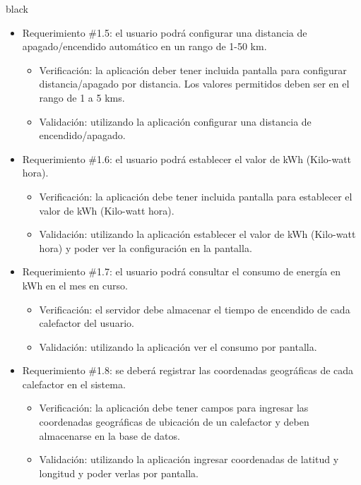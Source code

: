 \documentclass[
11pt, %
codirector, %
]{charter}
\begin{document}
\begin{consigna}{black}
\begin{itemize}
\item Requerimiento \#1.5: el usuario podrá configurar una distancia de apagado/encendido automático en un rango de 1-50 km.

\begin{itemize}
	\item Verificación: la aplicación deber tener incluida pantalla para configurar distancia/apagado por distancia. Los valores permitidos deben ser en el rango de 1 a 5 kms.
	\item Validación: utilizando la aplicación configurar una distancia de encendido/apagado.
\end{itemize}

\item Requerimiento \#1.6: el usuario podrá establecer el valor de kWh (Kilo-watt hora).

\begin{itemize}
	\item Verificación: la aplicación debe tener incluida pantalla para establecer el valor de kWh (Kilo-watt hora).
	\item Validación: utilizando la aplicación establecer el valor de kWh (Kilo-watt hora) y poder ver la configuración en la pantalla.
\end{itemize}

\item Requerimiento \#1.7: el usuario podrá consultar el consumo de energía en kWh en el mes en curso.

\begin{itemize}
	\item Verificación: el servidor debe almacenar el tiempo de encendido de cada calefactor del usuario.
	\item Validación: utilizando la aplicación ver el consumo por pantalla.
\end{itemize}

\item Requerimiento \#1.8: se deberá registrar las coordenadas geográficas de cada calefactor en el sistema.

\begin{itemize}
	\item Verificación: la aplicación debe tener campos para ingresar las coordenadas geográficas de ubicación de un calefactor y deben almacenarse en la base de datos.
	\item Validación: utilizando la aplicación ingresar coordenadas de latitud y longitud y poder verlas por pantalla.
\end{itemize}


\end{itemize}
\end{consigna}
\end{document}
